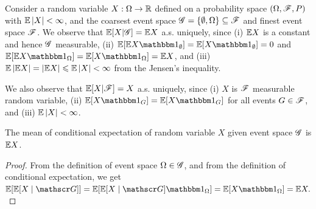 \documentclass[letterpaper,10pt,english]{article}
\begin{document}
\begin{shaded}
\begin{exmp}
Consider a random variable $X:\Omega\to\mathbb{R}$ defined on a probability space $(\Omega,\mathscr{F},P)$ with $\mathbb{E}\left\lvert X\right\rvert < \infty$, 
and the coarsest event space $\mathscr{G} = \left\{\emptyset, \Omega\right\} \subseteq \mathscr{F}$ and finest event space $\mathscr{F}$. 
We observe that $\mathbb{E}[X|\mathscr{G}] = \mathbb{E} X$ a.s. uniquely, since 
(i) $\mathbb{E} X$ is a constant and hence $\mathscr{G}$ measurable, 
(ii) $\E[\E X \Ind{\emptyset}] = \E[X \Ind{\emptyset}] = 0$ and $\E[\E X \Ind{\Omega}] = \E[X \Ind{\Omega}] = \E X$, and 
(iii) $\mathbb{E}\left\lvert\mathbb{E} X\right\rvert = \left\lvert\mathbb{E} X\right\rvert \leqslant \mathbb{E} \left\lvert X\right\rvert < \infty$ from the Jensen's inequality. 

We also observe that $\mathbb{E}[X|\mathscr{F}] = X$ a.s. uniquely, since 
(i) $X$ is $\mathscr{F}$ measurable random variable, 
(ii) $\E[ X \Ind{G}] = \E[X \Ind{G}]$ for all events $G\in \mathscr{F}$, and 
(iii) $\mathbb{E}\left\lvert X\right\rvert < \infty$. 
\end{exmp}
\end{shaded}
\begin{lem} 
The mean of conditional expectation of random variable $X$ given event space $\mathscr{G}$ is $\mathbb{E} X$. 
\end{lem}
\begin{proof} 
From the definition of event space $\Omega\in\mathscr{G}$, 
and from the definition of conditional expectation, we get 
$
\E[\E[X\mid \sG]] 
= \E[\E[X\mid \sG]\Ind{\Omega}] 
= \E[X\Ind{\Omega}]
= \E X.  
$
\end{proof}
\end{document}
